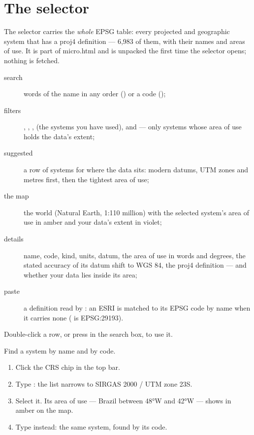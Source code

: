 \section{The selector}\label{sec:crs-selector}


The selector carries the \emph{whole} EPSG table: every projected and geographic system that has a proj4
definition — 6,983 of them, with their names and areas of use. It is part of micro.html and is unpacked
the first time the selector opens; nothing is fetched.

\begin{description}
\item[search] words of the name in any order () or a code ();
\item[filters] , , ,  (the systems you have used), and
   — only systems whose area of use holds the data's extent;
\item[suggested] a row of systems for where the data sits: modern datums, UTM zones and metres first,
  then the tightest area of use;
\item[the map] the world (Natural Earth, 1:110 million) with the selected system's area of use in amber
  and your data's extent in violet;
\item[details] name, code, kind, units, datum, the area of use in words and degrees, the stated accuracy
  of its datum shift to WGS 84, the proj4 definition — and whether your data lies inside its area;
\item[paste] a definition read by : an ESRI  is matched to its EPSG code by name
  when it carries none ( is EPSG:29193).
\end{description}

Double-click a row, or press  in the search box, to use it.

\begin{tryit}
Find a system by name and by code.
\begin{enumerate}
\item Click the CRS chip in the top bar.
\item Type : the list narrows to SIRGAS 2000 / UTM zone 23S.
\item Select it. Its area of use — Brazil between 48°W and 42°W — shows in amber on the map.
\item Type  instead: the same system, found by its code.
\end{enumerate}
\end{tryit}

